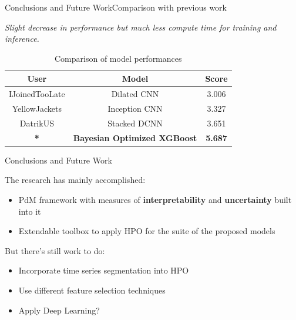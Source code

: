 \documentclass{beamer}
\begin{document}
        \begin{frame}{Conclusions and Future Work}{Comparison with previous work}

            \textit{Slight decrease in performance but much less compute time for training and inference.}
            \begin{table}
                \centering
                \begin{tabular}{ ccc }
                    \hline
                    User & Model & Score \\
                    \hline
                    IJoinedTooLate \cite{phm2021-1st-cnn} & Dilated CNN & 3.006 \\
                    YellowJackets \cite{phm2021-2nd-inception} & Inception CNN & 3.327 \\
                    DatrikUS \cite{phm2021-3rd-stacked-cnn} & Stacked DCNN & 3.651 \\
                    \textbf{*} & \textbf{Bayesian Optimized XGBoost} & \textbf{5.687} \\
                    \hline
                \end{tabular}
                \caption{Comparison of model performances}
            \end{table}
        \end{frame}

        \begin{frame}{Conclusions and Future Work}

            The research has mainly accomplished:
            \begin{itemize}
                \item PdM framework with measures of \textbf{interpretability} and \textbf{uncertainty} built into it
                \item Extendable toolbox to apply HPO for the suite of the proposed models
            \end{itemize}

            But there's still work to do:
            \begin{itemize}
                \item Incorporate time series segmentation into HPO
                \item Use different feature selection techniques
                \item Apply Deep Learning?
            \end{itemize}
        \end{frame}
\end{document}
